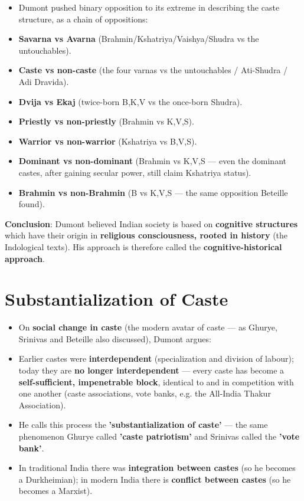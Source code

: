 \begin{KeyConcept}
\begin{itemize}
\item Dumont pushed binary opposition to its extreme in describing the caste structure, as a chain of oppositions:
\item \textbf{Savarna vs Avarna} (Brahmin/Kshatriya/Vaishya/Shudra vs the untouchables).
\item \textbf{Caste vs non-caste} (the four varnas vs the untouchables / Ati-Shudra / Adi Dravida).
\item \textbf{Dvija vs Ekaj} (twice-born B,K,V vs the once-born Shudra).
\item \textbf{Priestly vs non-priestly} (Brahmin vs K,V,S).
\item \textbf{Warrior vs non-warrior} (Kshatriya vs B,V,S).
\item \textbf{Dominant vs non-dominant} (Brahmin vs K,V,S --- even the dominant castes, after gaining secular power, still claim Kshatriya status).
\item \textbf{Brahmin vs non-Brahmin} (B vs K,V,S --- the same opposition Beteille found).
\end{itemize}
\end{KeyConcept}

\begin{KeyConcept}
\textbf{Conclusion}: Dumont believed Indian society is based on \textbf{cognitive structures} which have their origin in \textbf{religious consciousness, rooted in history} (the Indological texts). His approach is therefore called the \textbf{cognitive-historical approach}.
\end{KeyConcept}

\section{Substantialization of Caste}

\begin{KeyConcept}
\begin{itemize}
\item On \textbf{social change in caste} (the modern avatar of caste --- as Ghurye, Srinivas and Beteille also discussed), Dumont argues:
\item Earlier castes were \textbf{interdependent} (specialization and division of labour); today they are \textbf{no longer interdependent} --- every caste has become a \textbf{self-sufficient, impenetrable block}, identical to and in competition with one another (caste associations, vote banks, e.g. the All-India Thakur Association).
\item He calls this process the \textbf{'substantialization of caste'} --- the same phenomenon Ghurye called \textbf{'caste patriotism'} and Srinivas called the \textbf{'vote bank'}.
\item In traditional India there was \textbf{integration between castes} (so he becomes a Durkheimian); in modern India there is \textbf{conflict between castes} (so he becomes a Marxist).
\end{itemize}
\end{KeyConcept}

